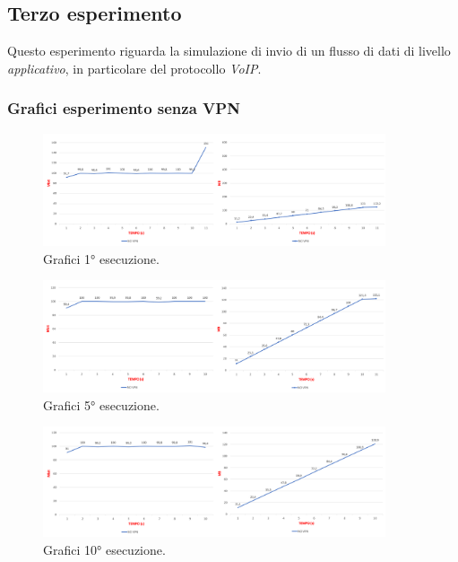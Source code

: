 \newpage
\subsection{Terzo esperimento}
Questo esperimento riguarda la simulazione di invio di un flusso di dati di livello \emph{applicativo}, in particolare del protocollo \emph{VoIP}.  
\subsubsection{Grafici esperimento senza VPN}

\begin{figure}[h] \includegraphics[width=0.9\textwidth] {Tesi magistrale/capitoli/images/27.png}
\centering
\caption{Grafici 1° esecuzione.}
\end{figure}

\begin{figure}[h] \includegraphics[width=0.9\textwidth] {Tesi magistrale/capitoli/images/28.png}
\centering
\caption{Grafici 5° esecuzione.}
\end{figure}

\begin{figure}[h] \includegraphics[width=0.9\textwidth] {Tesi magistrale/capitoli/images/29.png}
\centering
\caption{Grafici 10° esecuzione.}
\end{figure}


